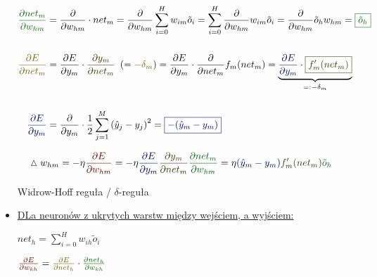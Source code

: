 \documentclass[10pt, a4paper]{article}
\begin{document}
\begin{center}
\begin{itemize}
\begin{align*}
\textcolor{green}{\frac{\partial net_m }{ \partial w_{hm} }} &= \frac{ \partial }{ \partial w_{hm} } \cdot net_m
= \frac{ \partial }{ \partial w_{hm} } \sum_{i=0}^H w_{im} \tilde{o}_i 
= \sum_{i=0}^H \frac{ \partial }{ \partial w_{hm} } w_{im} \tilde{o}_i 
= \frac{ \partial }{ \partial w_{hm} } \tilde{o}_h w_{hm} 
= \text{\textcolor{green}{\framebox{$ \tilde{o}_h $}}} \\
\\
\textcolor{magenta}{\frac{\partial E }{ \partial net_m }} &= \frac{ \partial E }{ \partial y_m } \cdot \textcolor{orange}{\frac{ \partial y_m }{ \partial net_m }} \ \left( = \textcolor{magenta}{- \delta_m} \right) 
= \frac{ \partial E }{ \partial y_m } \cdot \frac{ \partial }{ \partial net_m } f_m(net_m) 
= \underbrace{\textcolor{blue}{\frac{ \partial E }{ \partial y_m }} \cdot \text{\textcolor{orange}{\framebox{$ f'_m (net_m) $}}}}_{=: -\delta_m} \\
\\
\textcolor{blue}{\frac{ \partial E }{ \partial y_m }} &= \frac{ \partial }{ \partial y_m } \cdot \frac{1}{2} \sum_{j=1}^M \left( \hat{y}_j - y_j \right)^2 
= \text{\textcolor{blue}{\framebox{$ - (\hat{y}_m - y_m) $}}} \\
\end{align*}

\begin{align*}
\vartriangle w_{hm} &= - \eta \textcolor{red}{\frac{ \partial E }{ \partial w_{hm} }} 
= \textcolor{blue}{-} \eta \textcolor{blue}{\frac{ \partial E }{ \partial y_m }} \textcolor{orange}{\frac{ \partial y_m}{ \partial net_m}} \textcolor{green}{\frac{ \partial net_m}{ \partial w_{hm}}} 
= \eta \textcolor{blue}{\left( \hat{y}_m - y_m \right)} \textcolor{orange}{f'_m(net_m)} \textcolor{green}{\tilde{o}_h}
\end{align*}


Widrow-Hoff reguła / $\delta$-reguła
\\

\item[]
\underline{DLa neuronów z ukrytych warstw między wejściem, a wyjściem:}

$net_h = \sum_{i=0}^H w_{ih} \tilde{o}_i$

$ \textcolor{red}{\frac{\partial E }{ \partial w_{kh} }} = \textcolor{magenta}{\frac{\partial E }{ \partial net_h }} \cdot \textcolor{green}{\frac{ \partial net_h }{ \partial w_{kh} } }$


\end{itemize}
\end{center}
\end{document}
